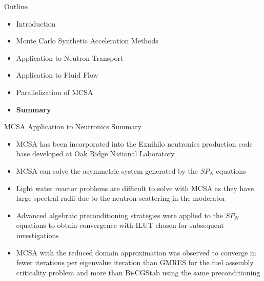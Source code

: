 \documentclass{beamer}
\begin{document}
\begin{frame}{Outline}

  \begin{itemize}
  \item Introduction
    \bigskip
  \item Monte Carlo Synthetic Acceleration Methods
    \bigskip
  \item Application to Neutron Transport
    \bigskip
  \item Application to Fluid Flow
    \bigskip
  \item Parallelization of MCSA
    \bigskip
  \item \textbf{Summary}
  \end{itemize}

\end{frame}

\begin{frame}{MCSA Application to Neutronics Summary}

  \small{
    \begin{itemize}
    \item MCSA has been incorporated into the Exnihilo neutronics
      production code base developed at Oak Ridge National Laboratory
      \medskip
    \item MCSA can solve the asymmetric system generated by the $SP_N$
      equations
      \medskip
    \item Light water reactor problems are difficult to solve with MCSA as
      they have large spectral radii due to the neutron scattering in the
      moderator
      \medskip
    \item Advanced algebraic preconditioning strategies were applied to
      the $SP_N$ equations to obtain convergence with ILUT chosen for
      subsequent investigations
      \medskip
    \item MCSA with the reduced domain approximation was observed to
      converge in fewer iterations per eigenvalue iteration than GMRES
      for the fuel assembly criticality problem and more than
      Bi-CGStab using the same preconditioning
    \end{itemize}
  }

\end{frame}
\end{document}

